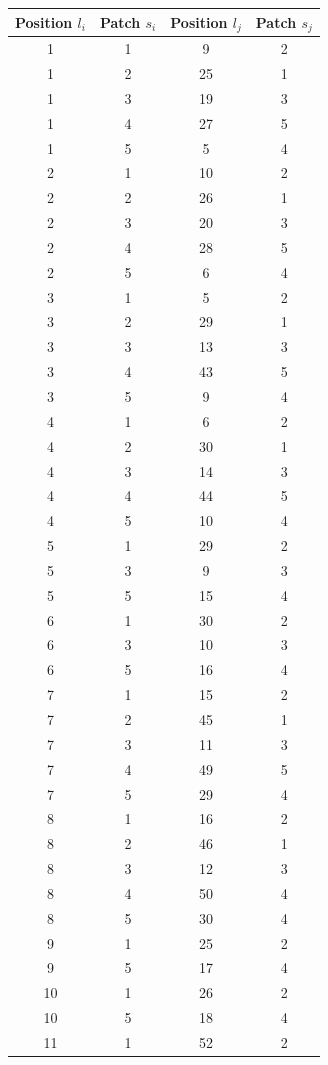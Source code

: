\documentclass[a4paper, amsfonts, amssymb, amsmath, reprint, showkeys, nofootinbib, oneside]{revtex4-1}
\begin{document}
\begin{longtable}[h!]{ cccc }
	\hline
	Position $l_i$ & Patch $s_i$ & Position $l_j$ & Patch $s_j$ \\
	\hline
	1 & 1 & 9 & 2 \\
	1 & 2 & 25 & 1 \\
	1 & 3 & 19 & 3 \\
	1 & 4 & 27 & 5 \\
	1 & 5 & 5 & 4 \\
	2 & 1 & 10 & 2 \\
	2 & 2 & 26 & 1 \\
	2 & 3 & 20 & 3 \\
	2 & 4 & 28 & 5 \\
	2 & 5 & 6 & 4 \\
	3 & 1 & 5 & 2 \\
	3 & 2 & 29 & 1 \\
	3 & 3 & 13 & 3 \\
	3 & 4 & 43 & 5 \\
	3 & 5 & 9 & 4 \\
	4 & 1 & 6 & 2 \\
	4 & 2 & 30 & 1 \\
	4 & 3 & 14 & 3 \\
	4 & 4 & 44 & 5 \\
	4 & 5 & 10 & 4 \\
	5 & 1 & 29 & 2 \\
	5 & 3 & 9 & 3 \\
	5 & 5 & 15 & 4 \\
	6 & 1 & 30 & 2 \\
	6 & 3 & 10 & 3 \\
	6 & 5 & 16 & 4 \\
	7 & 1 & 15 & 2 \\
	7 & 2 & 45 & 1 \\
	7 & 3 & 11 & 3 \\
	7 & 4 & 49 & 5 \\
	7 & 5 & 29 & 4 \\
	8 & 1 & 16 & 2 \\
	8 & 2 & 46 & 1 \\
	8 & 3 & 12 & 3 \\
	8 & 4 & 50 & 4 \\
	8 & 5 & 30 & 4 \\
	9 & 1 & 25 & 2 \\
	9 & 5 & 17 & 4 \\
	10 & 1 & 26 & 2 \\
	10 & 5 & 18 & 4 \\
	11 & 1 & 52 & 2 \\

\end{longtable}
\end{document}
